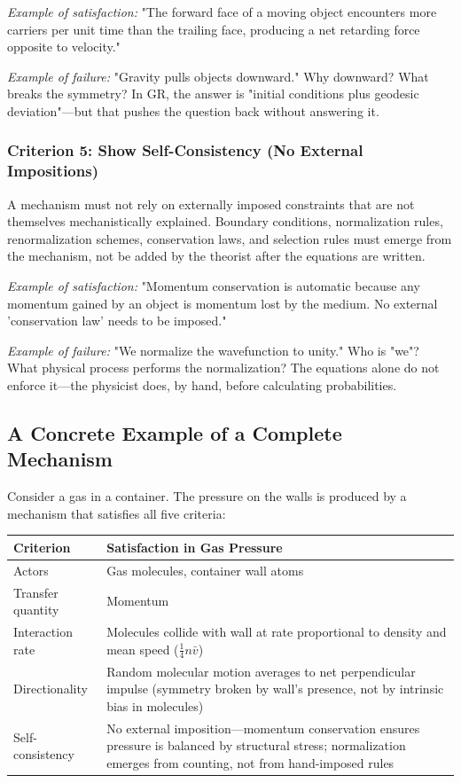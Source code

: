 \documentclass[12pt, a4paper]{article}
\begin{document}
\textit{Example of satisfaction:} "The forward face of a moving object encounters more carriers per unit time than the trailing face, producing a net retarding force opposite to velocity."

\textit{Example of failure:} "Gravity pulls objects downward." Why downward? What breaks the symmetry? In GR, the answer is "initial conditions plus geodesic deviation"—but that pushes the question back without answering it.

\subsubsection{Criterion 5: Show Self-Consistency (No External Impositions)}

A mechanism must not rely on externally imposed constraints that are not themselves mechanistically explained. Boundary conditions, normalization rules, renormalization schemes, conservation laws, and selection rules must emerge from the mechanism, not be added by the theorist after the equations are written.

\textit{Example of satisfaction:} "Momentum conservation is automatic because any momentum gained by an object is momentum lost by the medium. No external 'conservation law' needs to be imposed."

\textit{Example of failure:} "We normalize the wavefunction to unity." Who is "we"? What physical process performs the normalization? The equations alone do not enforce it—the physicist does, by hand, before calculating probabilities.

\subsection{A Concrete Example of a Complete Mechanism}
\label{subsec:gas_example}

Consider a gas in a container. The pressure on the walls is produced by a mechanism that satisfies all five criteria:

\begin{center}
\begin{tabular}{|p{3cm}|p{10cm}|}
\hline
\textbf{Criterion} & \textbf{Satisfaction in Gas Pressure} \\
\hline
Actors & Gas molecules, container wall atoms \\
\hline
Transfer quantity & Momentum \\
\hline
Interaction rate & Molecules collide with wall at rate proportional to density and mean speed (\( \frac{1}{4} n \bar{v} \)) \\
\hline
Directionality & Random molecular motion averages to net perpendicular impulse (symmetry broken by wall's presence, not by intrinsic bias in molecules) \\
\hline
Self-consistency & No external imposition—momentum conservation ensures pressure is balanced by structural stress; normalization emerges from counting, not from hand-imposed rules \\
\hline
\end{tabular}
\end{center}
\end{document}
